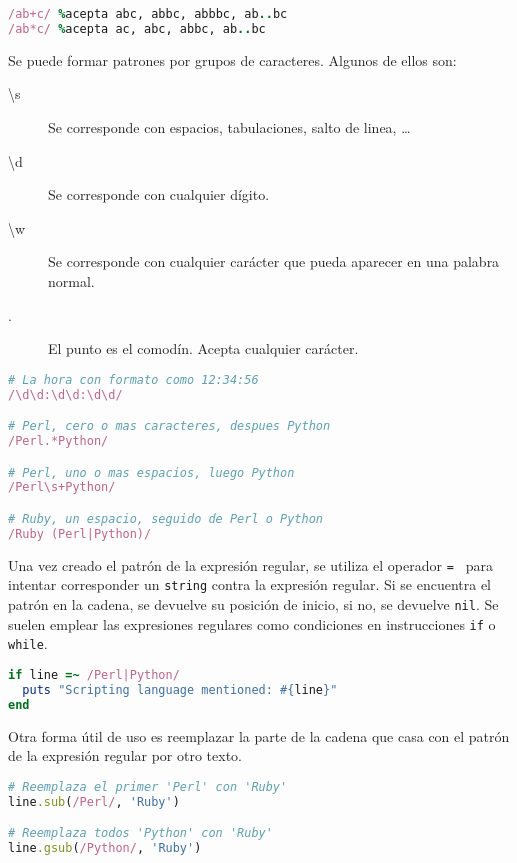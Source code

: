 \begin{lstlisting}[language=Ruby]
/ab+c/ %acepta abc, abbc, abbbc, ab..bc
/ab*c/ %acepta ac, abc, abbc, ab..bc
\end{lstlisting}

Se puede formar patrones por grupos de caracteres. Algunos de ellos son:
\begin{description}
\item[\textbackslash s] Se corresponde con espacios, tabulaciones, salto de linea, \ldots
\item[\textbackslash d] Se corresponde con cualquier dígito.
\item[\textbackslash w] Se corresponde con cualquier carácter que pueda aparecer en una palabra normal.
\item[.] El punto es el comodín. Acepta cualquier carácter.
\end{description}

\begin{lstlisting}[language=Ruby]
# La hora con formato como 12:34:56
/\d\d:\d\d:\d\d/

# Perl, cero o mas caracteres, despues Python
/Perl.*Python/

# Perl, uno o mas espacios, luego Python
/Perl\s+Python/

# Ruby, un espacio, seguido de Perl o Python     
/Ruby (Perl|Python)/
\end{lstlisting}

Una vez creado el patrón de la expresión regular, se utiliza el operador \texttt{=~} para intentar corresponder un \texttt{string} contra la expresión regular. Si se encuentra el patrón en la cadena, se devuelve su posición de inicio, si no, se devuelve \texttt{nil}. Se suelen emplear las expresiones regulares como condiciones en instrucciones \texttt{if} o \texttt{while}.

\begin{lstlisting}[language=Ruby]
if line =~ /Perl|Python/
  puts "Scripting language mentioned: #{line}"
end
\end{lstlisting}

Otra forma útil de uso es reemplazar la parte de la cadena que casa con el patrón de la expresión regular por otro texto.

\begin{lstlisting}[language=Ruby]
# Reemplaza el primer 'Perl' con 'Ruby'
line.sub(/Perl/, 'Ruby')

# Reemplaza todos 'Python' con 'Ruby'
line.gsub(/Python/, 'Ruby')
\end{lstlisting}

